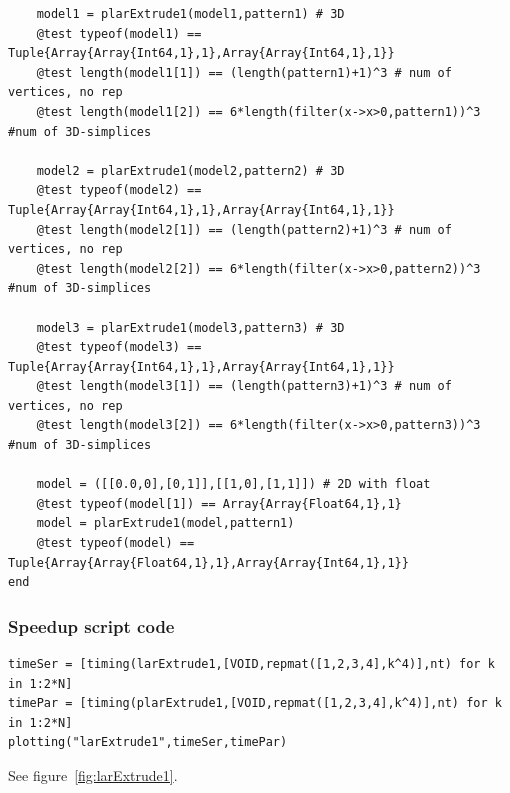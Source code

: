 \documentclass[a4paper,12pt,titlepage]{article}					%
\begin{document}
\begin{Verbatim}
	model1 = plarExtrude1(model1,pattern1) # 3D
	@test typeof(model1) == Tuple{Array{Array{Int64,1},1},Array{Array{Int64,1},1}}
	@test length(model1[1]) == (length(pattern1)+1)^3 # num of vertices, no rep
	@test length(model1[2]) == 6*length(filter(x->x>0,pattern1))^3 #num of 3D-simplices
	
	model2 = plarExtrude1(model2,pattern2) # 3D
	@test typeof(model2) == Tuple{Array{Array{Int64,1},1},Array{Array{Int64,1},1}}
	@test length(model2[1]) == (length(pattern2)+1)^3 # num of vertices, no rep
	@test length(model2[2]) == 6*length(filter(x->x>0,pattern2))^3 #num of 3D-simplices
	
	model3 = plarExtrude1(model3,pattern3) # 3D
	@test typeof(model3) == Tuple{Array{Array{Int64,1},1},Array{Array{Int64,1},1}}
	@test length(model3[1]) == (length(pattern3)+1)^3 # num of vertices, no rep
	@test length(model3[2]) == 6*length(filter(x->x>0,pattern3))^3 #num of 3D-simplices
	
	model = ([[0.0,0],[0,1]],[[1,0],[1,1]]) # 2D with float
	@test typeof(model[1]) == Array{Array{Float64,1},1}
	model = plarExtrude1(model,pattern1)
	@test typeof(model) == Tuple{Array{Array{Float64,1},1},Array{Array{Int64,1},1}}
end
\end{Verbatim}

\subsubsection{Speedup script code}
\begin{Verbatim}
timeSer = [timing(larExtrude1,[VOID,repmat([1,2,3,4],k^4)],nt) for k in 1:2*N]
timePar = [timing(plarExtrude1,[VOID,repmat([1,2,3,4],k^4)],nt) for k in 1:2*N]
plotting("larExtrude1",timeSer,timePar)
\end{Verbatim}

See figure~\ref{fig:larExtrude1}.
\end{document}

